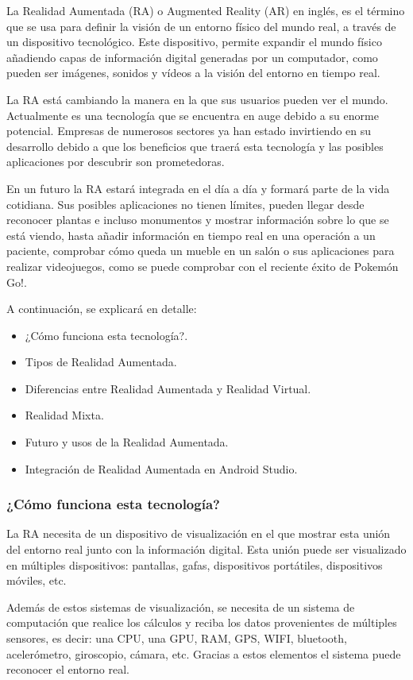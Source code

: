 La Realidad Aumentada (RA) \cite{URL::RealidadAumentada} o Augmented Reality (AR) en inglés, es el término que se usa para definir la visión de un entorno físico del mundo real, a través de un dispositivo tecnológico. Este dispositivo, permite expandir el mundo físico añadiendo capas de información digital generadas por un computador, como pueden ser imágenes, sonidos y vídeos a la visión del entorno en tiempo real. 

La RA está cambiando la manera en la que sus usuarios pueden ver el mundo. Actualmente es una tecnología que se encuentra en auge debido a su enorme potencial. Empresas de numerosos sectores ya han estado invirtiendo en su desarrollo debido a que los beneficios que traerá esta tecnología y las posibles aplicaciones por descubrir son prometedoras.


En un futuro la RA estará integrada en el día a día y formará parte de la vida cotidiana. Sus posibles aplicaciones no tienen límites, pueden llegar desde reconocer plantas e incluso monumentos y mostrar información sobre lo que se está viendo, hasta añadir información en tiempo real en una operación a un paciente, comprobar cómo queda un mueble en un salón o sus aplicaciones para realizar videojuegos, como se puede comprobar con el reciente éxito de Pokemón Go!. 

A continuación, se explicará en detalle:
\begin{itemize}
\item ¿Cómo funciona esta tecnología?.
\item Tipos de Realidad Aumentada.
\item Diferencias entre Realidad Aumentada y Realidad Virtual.
\item Realidad Mixta.
\item Futuro y usos de la Realidad Aumentada.
\item Integración de Realidad Aumentada en Android Studio.
\end{itemize}  

\subsubsection{¿Cómo funciona esta tecnología?}
La RA necesita de un dispositivo de visualización en el que mostrar esta unión del entorno real junto con la información digital. Esta unión puede ser visualizado en múltiples dispositivos: pantallas, gafas, dispositivos portátiles, dispositivos móviles, etc.
 
Además de estos sistemas de visualización, se necesita de un sistema de computación que realice los cálculos y reciba los datos provenientes de múltiples sensores, es decir: una CPU, una GPU, RAM, GPS, WIFI, bluetooth, acelerómetro, giroscopio, cámara, etc. Gracias a estos elementos el sistema puede reconocer el entorno real.

